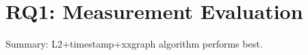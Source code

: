 \section{RQ1: Measurement Evaluation}






Summary: L2+timestamp+xxgraph algorithm performs best.

